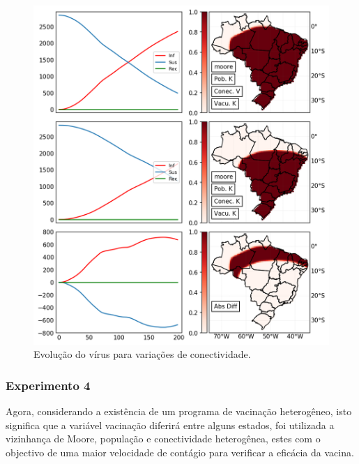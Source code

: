 \documentclass[a4paper,12pt]{article}
\begin{document}
\begin{figure}[!ht]
 \begin{center}
  \includegraphics[width=1\linewidth]{fig/Conectividad.png}
 \end{center}
 \caption{Evolução do vírus para variações de conectividade.}
\label{figure:conec}
\end{figure}

\newpage
\subsubsection{Experimento 4}
Agora, considerando a existência de um programa de vacinação heterogêneo, isto significa que a variável vacinação diferirá entre alguns estados, foi utilizada a vizinhança de Moore, população e conectividade heterogênea, estes com o objectivo de uma maior velocidade de contágio para verificar a eficácia da vacina.
\end{document}
